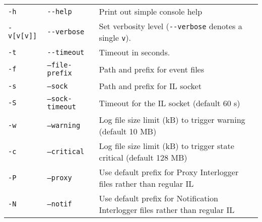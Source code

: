 \begin{tabularx}{\textwidth}{l l X}
 \texttt{-h} & \texttt{-{}-help} & Print out simple console help \\
 \texttt{-v[v[v]]} & \texttt{-{}-verbose} & Set verbosity level (\texttt{-{}-verbose} denotes a single \texttt{v}). \\
 \texttt{-t} & \texttt{-{}-timeout} & Timeout in seconds.\\
 \texttt{-f} & \texttt{--file-prefix} & Path and prefix for event files \\
 \texttt{-s} & \texttt{--sock} & Path and prefix for IL socket \\
 \texttt{-S} & \texttt{--sock-timeout} & Timeout for the IL socket (default 60 s) \\
 \texttt{-w} & \texttt{--warning} & Log file size limit (kB) to trigger warning (default 10 MB) \\
 \texttt{-c} & \texttt{--critical} & Log file size limit (kB) to trigger state critical (default 128 MB) \\
 \texttt{-P} & \texttt{--proxy} & Use default prefix for Proxy Interlogger files rather than regular IL \\
 \texttt{-N} & \texttt{--notif} & Use default prefix for Notification Interlogger files rather than regular IL \\
 \end{tabularx}

